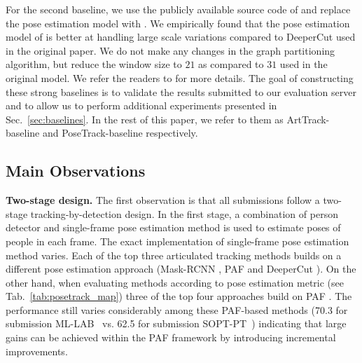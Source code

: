 \documentclass[10pt,twocolumn,letterpaper]{article}
\newcommand{\myparagraph}[1]{\vspace{0.1em}\noindent\textbf{#1}}
\newcommand{\SOPTPT}{SOPT-PT~\cite{SOPT-PT}\xspace}
\newcommand{\MLLab}{ML-LAB~\cite{ML-LAB}\xspace}
\begin{document}
For the second baseline, we use the publicly available source code of
\cite{Iqbal:2017:CVPR} and replace the pose estimation model with
\cite{cao16arxiv}. We empirically found that the pose estimation model of
\cite{cao16arxiv} is better at handling large scale variations compared to
DeeperCut \cite{insafutdinov16eccv} used in the original paper. We do not make any changes in the graph partitioning algorithm, but reduce the window size to $21$ as compared to $31$ used in the original model. We refer the readers to \cite{Iqbal:2017:CVPR} for more details. 
The goal of constructing these strong baselines is to validate the results submitted to our evaluation server and to allow us to perform additional experiments presented in
Sec.~\ref{sec:baselines}. In the rest of this paper, we refer to them as
ArtTrack-baseline and PoseTrack-baseline respectively. 




\subsection{Main Observations}
\myparagraph{Two-stage design.}  The first observation is that all
submissions follow a two-stage tracking-by-detection design. In the first stage,
a combination of person detector and single-frame pose estimation method is used
to estimate poses of people in each frame. The exact implementation of
single-frame pose estimation method varies. Each of the top three articulated
tracking methods builds on a different pose estimation approach (Mask-RCNN
\cite{he17iccv}, PAF \cite{cao16arxiv} and DeeperCut
\cite{insafutdinov16eccv}). On the other hand, when evaluating methods according
to pose estimation metric (see Tab.~\ref{tab:posetrack_map}) three of the top
four approaches build on PAF \cite{cao16arxiv}. The performance still varies
considerably among these PAF-based methods (70.3 for submission \MLLab vs. 62.5
for submission \SOPTPT) indicating that large gains can be achieved within the
PAF framework by introducing incremental improvements.
\end{document}
